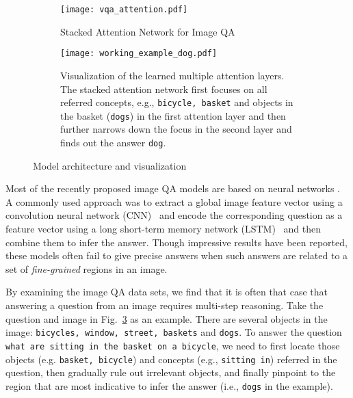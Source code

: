 \documentclass[10pt,twocolumn,letterpaper]{article}
\begin{document}
\begin{figure}[tbh]
  \centering
  \begin{subfigure}[t]{1.0\linewidth}
    \texttt{[image: vqa\_attention.pdf]}
    \centering
    \caption{Stacked Attention Network for Image QA}
    \label{fig:vqa_attention}
  \end{subfigure}

  \begin{subfigure}[t]{1.0\linewidth}
    \texttt{[image: working\_example\_dog.pdf]}
    \centering
    \caption{Visualization of the learned multiple attention layers. The
      stacked attention network first focuses on all referred concepts, e.g.,
      \texttt{bicycle, basket} and objects in the basket (\texttt{dogs}) in the
      first attention layer and then further narrows down the focus in the
      second layer and finds out the answer \texttt{dog}.}
    \label{fig:example}
  \end{subfigure}
  \caption{Model architecture and visualization}
  \label{fig:model_example}
 \vspace{-0.5cm}
\end{figure}

Most of the recently proposed image QA models are based on neural networks
\cite{gao2015you, ren2015imageqa, malinowski2014multi, antol2015vqa,
  malinowski2015ask}. A commonly used approach was to extract a global image
feature vector using a convolution neural network
(CNN)~\cite{lecun1998gradient} and encode the corresponding question as a
feature vector using a long short-term memory network
(LSTM)~\cite{hochreiter1997long} and then combine them to infer the
answer. Though impressive results have been reported, these models often fail
to give precise answers when such answers are related to a set of
\emph{fine-grained} regions in an image.

By examining the image QA data sets, we find that it is often that case that
answering a question from an image requires multi-step reasoning. Take the
question and image in Fig.~\ref{fig:model_example} as an example. There are
several objects in the image: \texttt{bicycles, window, street, baskets} and
\texttt{dogs}. To answer the question \texttt{what are sitting in the basket on
  a bicycle}, we need to first locate those objects (e.g. \texttt{basket,
  bicycle}) and concepts (e.g., \texttt{sitting in}) referred in the question,
then gradually rule out irrelevant objects, and finally pinpoint to the region
that are most indicative to infer the answer (i.e., \texttt{dogs} in the
example).
\end{document}
